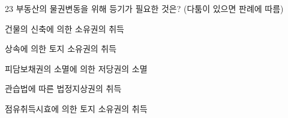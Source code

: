 \begin{question}{23}
부동산의 물권변동을 위해 등기가 필요한 것은? (다툼이 있으면 판례에 따름)
\begin{choices}
  \item 건물의 신축에 의한 소유권의 취득
  \item 상속에 의한 토지 소유권의 취득
  \item 피담보채권의 소멸에 의한 저당권의 소멸
  \item 관습법에 따른 법정지상권의 취득
  \item 점유취득시효에 의한 토지 소유권의 취득
\end{choices}
\end{question}
